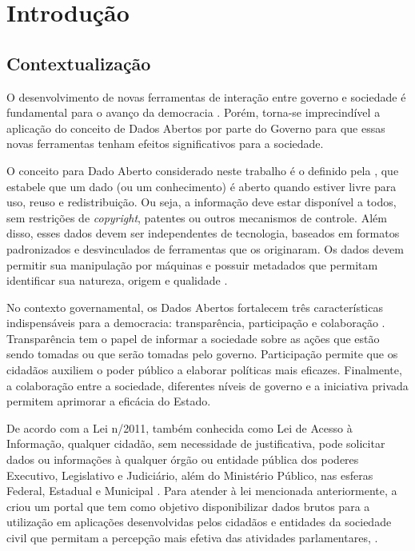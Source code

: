 \chapter{Introdução}

\section{Contextualização}
\label{sec:contextualização}

O desenvolvimento de novas ferramentas de interação entre governo e sociedade é fundamental para o avanço da democracia \cite{consegi2011}. Porém, torna-se imprecindível a aplicação do conceito de Dados Abertos por parte do Governo para que essas novas ferramentas tenham efeitos significativos para a sociedade.

O conceito para Dado Aberto considerado neste trabalho é o definido pela , que estabele que um dado (ou um conhecimento) é aberto quando estiver livre para uso, reuso e redistribuição. Ou seja, a informação deve estar disponível a todos, sem restrições de \textit{copyright}, patentes ou outros mecanismos de controle. Além disso, esses dados devem ser independentes de tecnologia, baseados em formatos padronizados e desvinculados de ferramentas que os originaram. Os dados devem permitir sua manipulação por máquinas e possuir metadados que permitam identificar sua natureza, origem e qualidade \cite{diniz2010}.

No contexto governamental, os Dados Abertos fortalecem três características indispensáveis para a democracia: transparência, participação e colaboração \cite{consegi2011}. Transparência tem o papel de informar a sociedade sobre as ações que estão sendo tomadas ou que serão tomadas pelo governo. Participação permite que os cidadãos auxiliem o poder público a elaborar políticas mais eficazes. Finalmente, a colaboração entre a sociedade, diferentes níveis de governo e a iniciativa privada permitem aprimorar a eficácia do Estado.

De acordo com a Lei n/2011, também conhecida como Lei de Acesso à Informação, qualquer cidadão, sem necessidade de justificativa, pode solicitar dados ou informações à qualquer órgão ou entidade pública dos poderes Executivo, Legislativo e Judiciário, além do Ministério Público, nas esferas Federal, Estadual e Municipal \cite{lei_acesso_informacao}. Para atender à lei mencionada anteriormente, a  criou um portal que tem como objetivo disponibilizar dados brutos para a utilização em aplicações desenvolvidas pelos cidadãos e entidades da sociedade civil que permitam a percepção mais efetiva das atividades parlamentares, .


